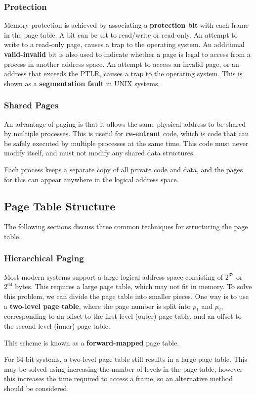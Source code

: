 \documentclass{article}
\begin{document}
\subsubsection{Protection}
Memory protection is achieved by associating a \textbf{protection bit}
with each frame in the page table. A bit can be set to read/write or
read-only. An attempt to write to a read-only page, causes a trap to
the operating system. An additional \textbf{valid-invalid} bit is also
used to indicate whether a page is legal to access from a process in
another address space. An attempt to access an invalid page, or an
address that exceeds the PTLR, causes a trap to the operating system.
This is shown as a \textbf{segmentation fault} in UNIX systems.
\subsubsection{Shared Pages}
An advantage of paging is that it allows the same physical address to
be shared by multiple processes. This is useful for \textbf{re-entrant}
code, which is code that can be safely executed by multiple processes
at the same time. This code must never modify itself, and must not
modify any shared data structures.

Each process keeps a separate copy of all private code and data, and
the pages for this can appear anywhere in the logical address space.
\subsection{Page Table Structure}
The following sections discuss three common techniques for structuring
the page table.
\subsubsection{Hierarchical Paging}
Most modern systems support a large logical address space consisting of
\(2^{32}\) or \(2^{64}\) bytes. This requires a large page table, which
may not fit in memory. To solve this problem, we can divide the page
table into smaller pieces. One way is to use a \textbf{two-level page
table}, where the page number is split into \(p_1\) and \(p_2\),
corresponding to an offset to the first-level (outer) page table, and
an offset to the second-level (inner) page table.

This scheme is known as a \textbf{forward-mapped} page table.

For 64-bit systems, a two-level page table still results in a large
page table. This may be solved using increasing the number of levels in
the page table, however this increases the time required to access a
frame, so an alternative method should be considered.
\end{document}
